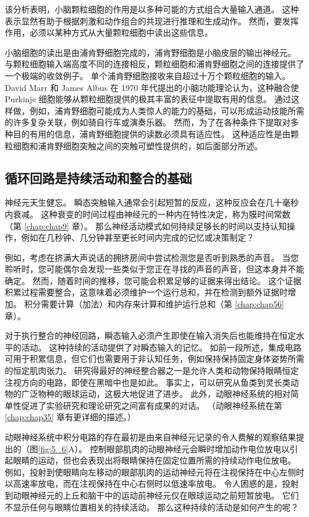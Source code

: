 该分析表明，小脑颗粒细胞的作用是以多种可能的方式组合大量输入通道。
这种表示显然有助于根据刺激和动作组合的共现进行推理和生成动作。
然而，要发挥作用，必须以某种方式从大量颗粒细胞中读出这些信息。


小脑细胞的读出是由浦肯野细胞完成的，浦肯野细胞是小脑皮层的输出神经元。
与颗粒细胞输入端高度不同的连接相反，颗粒细胞和浦肯野细胞之间的连接提供了一个极端的收敛例子。
单个浦肯野细胞接收来自超过十万个颗粒细胞的输入。
David Marr 和 James Albus 在 1970 年代提出的小脑功能理论认为，这种融合使 Purkinje 细胞能够从颗粒细胞提供的极其丰富的表征中提取有用的信息。 
通过这样做，例如，浦肯野细胞可能成为人类惊人的能力的基础，可以形成运动技能所需的许多复杂关联，例如骑自行车或演奏乐器。 
然而，为了在各种条件下提取对多种目的有用的信息，浦肯野细胞提供的读数必须具有适应性。 
这种适应性是由颗粒细胞和浦肯野细胞突触之间的突触可塑性提供的，如后面部分所述。


\subsection{循环回路是持续活动和整合的基础}
神经元天生健忘。 
瞬态突触输入通常会引起短暂的反应，这种反应会在几十毫秒内衰减。
这种衰变的时间过程由神经元的一种内在特性决定，称为膜时间常数（第 \ref{chap:chap9} 章）。 
那么神经活动模式如何持续足够长的时间以支持认知操作，例如在几秒钟、几分钟甚至更长时间内完成的记忆或决策制定？


例如，考虑在挤满大声说话的拥挤房间中尝试检测您是否听到熟悉的声音。 
当您聆听时，您可能偶尔会发现一些类似于您正在寻找的声音的声音，但这本身并不能确定。 
然而，随着时间的推移，您可能会积累足够的证据来得出结论。 
这个证据积累过程需要整合，这意味着必须维护一个运行总和，并在检测到额外证据时增加。 积分需要计算（加法）和内存来计算和维护运行总和（第 \ref{chap:chap56} 章）。


对于执行整合的神经回路，瞬态输入必须产生即使在输入消失后也能维持在恒定水平的活动。 
这种持续的活动提供了对瞬态输入的记忆。 
如前一段所述，集成电路可用于积累信息，但它们也需要用于非认知任务，例如保持保持固定身体姿势所需的恒定肌肉张力。 
研究得最好的神经整合器之一是允许人类和动物保持眼睛恒定注视方向的电路，即使在黑暗中也是如此。 
事实上，可以研究从鱼类到灵长类动物的广泛物种的眼球运动，这极大地促进了进步。 
此外，动眼神经系统的相对简单性促进了实验研究和理论研究之间富有成果的对话。
（动眼神经系统在第 \ref{chap:chap35} 章有更详细的描述。）


动眼神经系统中积分电路的存在最初是由来自神经元记录的令人费解的观察结果提出的（图\ref{fig:5_6}A）。 
控制眼部肌肉的动眼神经元会瞬时增加动作电位放电以引起眼睛的运动，但也会表现出将眼睛保持在固定位置所需的持续动作电位放电。 
例如，投射到使眼睛向左移动的眼部肌肉的运动神经元将在注视保持在中心左侧时以高速率放电，而在注视保持在中心右侧时以低速率放电。 
令人困惑的是，投射到动眼神经元的上丘和脑干中的运动前神经元仅在眼球运动之前短暂放电。 
它们不显示任何与眼睛位置相关的持续活动。 
那么这种持续的活动是如何产生的呢？

